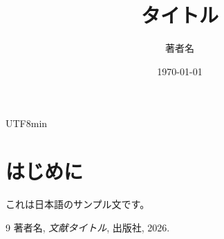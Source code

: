 \documentclass[a4paper,11pt]{ltjsarticle}
\title{タイトル}
\author{著者名}
\date{\today}
\begin{document}
\ifdefined\directlua\else\begin{CJK}{UTF8}{min}\fi

\maketitle

\section{はじめに}
これは日本語のサンプル文です。\cite{sample}

\begin{thebibliography}{9}
    著者名, \emph{文献タイトル}, 出版社, 2026.
\end{thebibliography}

\ifdefined\directlua\else\end{CJK}\fi
\end{document}
